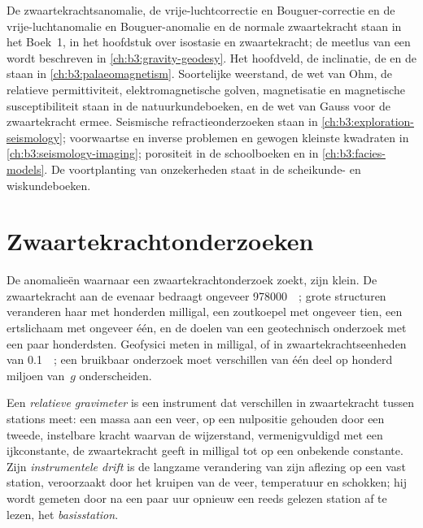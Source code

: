 \begin{recall}
De zwaartekrachtsanomalie, de vrije-luchtcorrectie en Bouguer-correctie en de
vrije-luchtanomalie en Bouguer-anomalie en de normale zwaartekracht staan in het Boek~1, in het hoofdstuk over isostasie
en zwaartekracht; de meetlus van een  wordt beschreven in
\cref{ch:b3:gravity-geodesy}. Het hoofdveld, de inclinatie, de
 en de  staan in
\cref{ch:b3:palaeomagnetism}. Soortelijke weerstand, de wet van Ohm, de relatieve
permittiviteit, elektromagnetische golven, magnetisatie en magnetische
susceptibiliteit staan in de natuurkundeboeken, en de wet van Gauss voor
de zwaartekracht ermee. Seismische refractieonderzoeken staan in
\cref{ch:b3:exploration-seismology}; voorwaartse en inverse problemen en
gewogen kleinste kwadraten in \cref{ch:b3:seismology-imaging}; porositeit in
de schoolboeken en  in \cref{ch:b3:facies-models}. De
voortplanting van onzekerheden staat in de scheikunde- en wiskundeboeken.
\end{recall}

\section{Zwaartekrachtonderzoeken}\label{sec:b3:field-lab-methods-3:gravity}

De anomalieën waarnaar een zwaartekrachtonderzoek zoekt, zijn klein. De
zwaartekracht aan de evenaar bedraagt ongeveer \qty{978000}{\milli\gal}; grote
structuren veranderen haar met honderden milligal, een zoutkoepel met ongeveer
tien, een ertslichaam met ongeveer één, en de doelen van een geotechnisch
onderzoek met een paar honderdsten. Geofysici meten in
milligal, of in zwaartekrachtseenheden van \qty{0.1}{\milli\gal}; een bruikbaar
onderzoek moet verschillen van één deel op honderd miljoen van~$g$ onderscheiden.

\begin{definition}\label{def:b3:field-lab-methods-3:gravimeter}
Een \emph{relatieve gravimeter} is een instrument
dat verschillen in zwaartekracht tussen stations meet: een massa aan een veer,
op een nulpositie gehouden door een tweede, instelbare kracht waarvan de
wijzerstand, vermenigvuldigd met een ijkconstante, de zwaartekracht geeft in
milligal tot op een onbekende constante. Zijn \emph{instrumentele
drift} is de langzame verandering van zijn aflezing op
een vast station, veroorzaakt door het kruipen van de veer, temperatuur en
schokken; hij wordt gemeten door na een paar uur opnieuw een reeds gelezen
station af te lezen, het \emph{basisstation}.
\end{definition}

